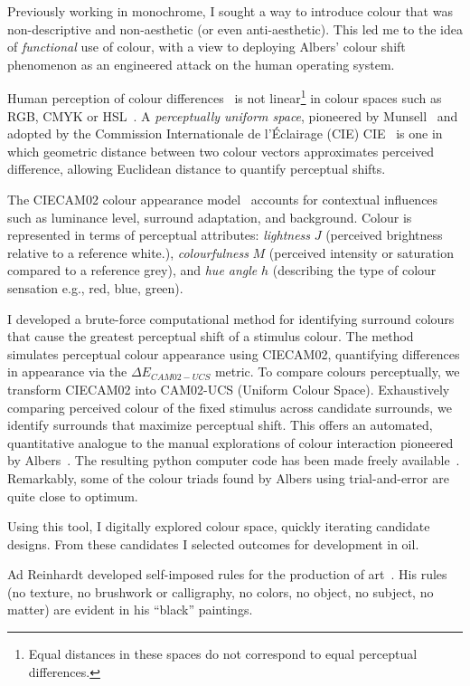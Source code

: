 \documentclass[12pt]{article}
\begin{document}
Previously working in monochrome, I sought a way to introduce
colour that was non-descriptive and non-aesthetic (or even
anti-aesthetic). This led me to the idea of \emph{functional} use of
colour, with a view to deploying Albers' colour shift phenomenon
as an engineered attack on the human operating system.

Human perception of colour differences~\cite{MacAdam1942} is not
linear\footnote{Equal distances in these spaces do not correspond to
  equal perceptual differences.} in colour spaces such as RGB, CMYK or
HSL~\cite{Luo2001CIECAM02}.  A \emph{perceptually uniform space},
pioneered by Munsell~\cite{Munsell1915} and adopted by the Commission
Internationale de l'\'{E}clairage (CIE)
CIE~\cite{CIE1976,CIE1978Uniform,Luo2001CIEDE2000} is one in which
geometric distance between two colour vectors approximates perceived
difference, allowing Euclidean distance to quantify perceptual shifts.

The CIECAM02 colour appearance
model~\cite{Luo2001CIECAM02,CIE1592004} accounts for
contextual influences such as luminance level, surround adaptation,
and background. Colour is represented in terms of perceptual
attributes: \emph{lightness} $J$ (perceived brightness relative to a
reference white.), \emph{colourfulness} $M$ (perceived intensity or
saturation compared to a reference grey), and \emph{hue angle} $h$
(describing the type of colour sensation e.g., red, blue, green).

I developed a brute-force computational method for identifying
surround colours that cause the greatest perceptual shift of a
stimulus colour. The method simulates perceptual colour appearance
using CIECAM02, quantifying differences in appearance via the
$\Delta E_{CAM02-UCS}$ metric. To compare colours perceptually, we
transform CIECAM02 into CAM02-UCS (Uniform Colour Space).
Exhaustively comparing perceived colour of the fixed stimulus across
candidate surrounds, we identify surrounds that maximize perceptual
shift. This offers an automated, quantitative analogue to the manual
explorations of colour interaction pioneered by
Albers~\cite{albers}. The resulting python computer code has been made
freely available~\cite{grant2025colourshift}. Remarkably, some of the
colour triads found by Albers using trial-and-error are quite close to
optimum.

Using this tool, I digitally explored colour space, quickly iterating
candidate designs. From these candidates I selected outcomes for
development in oil.

Ad Reinhardt developed self-imposed rules for the production of
art~\cite[p. 203-7]{artasart}. His rules (no texture, no brushwork
or calligraphy, no colors, no object, no subject, no matter) are
evident in his ``black'' paintings.
\end{document}

